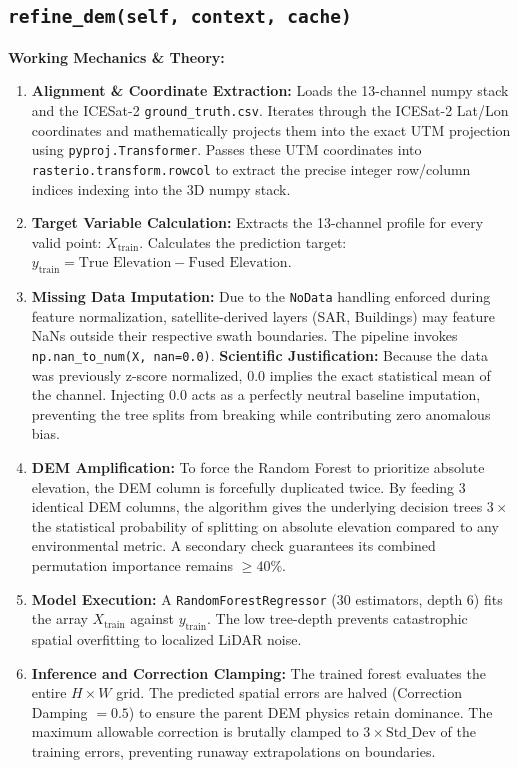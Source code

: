 \documentclass[11pt,a4paper,oneside]{report}
\begin{document}
\subsection{\texttt{refine\_dem(self, context, cache)}}
\textbf{Working Mechanics \& Theory:}
\begin{enumerate}
    \item \textbf{Alignment \& Coordinate Extraction:} Loads the 13-channel numpy stack and the ICESat-2 \texttt{ground\_truth.csv}. Iterates through the ICESat-2 Lat/Lon coordinates and mathematically projects them into the exact UTM projection using \texttt{pyproj.Transformer}. Passes these UTM coordinates into \texttt{rasterio.transform.rowcol} to extract the precise integer row/column indices indexing into the 3D numpy stack.
    \item \textbf{Target Variable Calculation:} Extracts the 13-channel profile for every valid point: $X_{\text{train}}$. Calculates the prediction target: $y_{\text{train}} = \text{True Elevation} - \text{Fused Elevation}$.
    \item \textbf{Missing Data Imputation:} Due to the \texttt{NoData} handling enforced during feature normalization, satellite-derived layers (SAR, Buildings) may feature NaNs outside their respective swath boundaries. The pipeline invokes \texttt{np.nan\_to\_num(X, nan=0.0)}. \textbf{Scientific Justification:} Because the data was previously z-score normalized, $0.0$ implies the exact statistical mean of the channel. Injecting $0.0$ acts as a perfectly neutral baseline imputation, preventing the tree splits from breaking while contributing zero anomalous bias.
    \item \textbf{DEM Amplification:} To force the Random Forest to prioritize absolute elevation, the DEM column is forcefully duplicated twice. By feeding $3$ identical DEM columns, the algorithm gives the underlying decision trees $3\times$ the statistical probability of splitting on absolute elevation compared to any environmental metric. A secondary check guarantees its combined permutation importance remains $\ge 40\%$.
    \item \textbf{Model Execution:} A \texttt{RandomForestRegressor} (30 estimators, depth 6) fits the array $X_{\text{train}}$ against $y_{\text{train}}$. The low tree-depth prevents catastrophic spatial overfitting to localized LiDAR noise.
    \item \textbf{Inference and Correction Clamping:} The trained forest evaluates the entire $H \times W$ grid. The predicted spatial errors are halved (Correction Damping $= 0.5$) to ensure the parent DEM physics retain dominance. The maximum allowable correction is brutally clamped to $3 \times \text{Std\_Dev}$ of the training errors, preventing runaway extrapolations on boundaries.

\end{enumerate}
\end{document}
